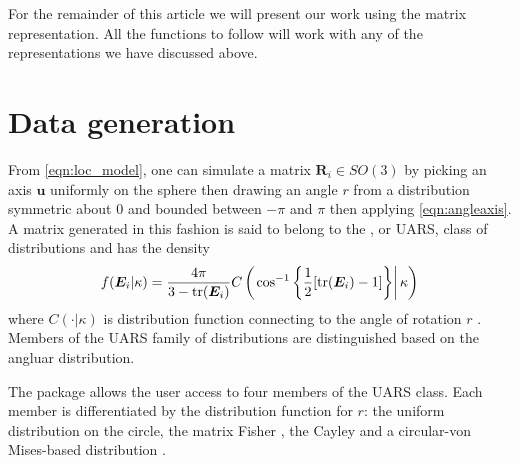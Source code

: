 
For the remainder of this article we will present our work using the matrix representation.  All the functions to follow will work with any of  the representations we have discussed above.

\section{Data generation} 

From \eqref{eqn:loc_model}, one can simulate a matrix $\bm{R}_i\in SO(3)$ by picking an axis $\bm u$ uniformly on the sphere then drawing an angle $r$ from a distribution symmetric about $0$ and bounded between $-\pi$ and $\pi$ then applying \eqref{eqn:angleaxis}.  A matrix generated in this fashion is said to belong to the , or UARS, class of distributions and has the density
\begin{equation}\label{eq:uarsden}
f(\bm E_i|\kappa)=\frac{4\pi}{3-\text{tr}(\bm E_i)}C\left(\left.\cos^{-1}\left\{\frac{1}{2}[\text{tr}(\bm E_i)-1]\right\}\right|\kappa\right)
\end{equation}
where $C(\cdot|\kappa)$ is distribution function connecting to the angle of rotation $r$ \citep{bingham2009}.  Members of the UARS family of distributions are distinguished based on the angluar distribution.


The  package allows the user access to four members of the UARS class.  Each member is differentiated by the distribution function for $r$: the uniform distribution on the circle, the matrix Fisher \citep{langevin2005, downs1972, khatri1977, jupp1979}, the Cayley  \citep{Schaeben1997, leon2006} and a circular-von Mises-based distribution \citep{bingham2009}. 

